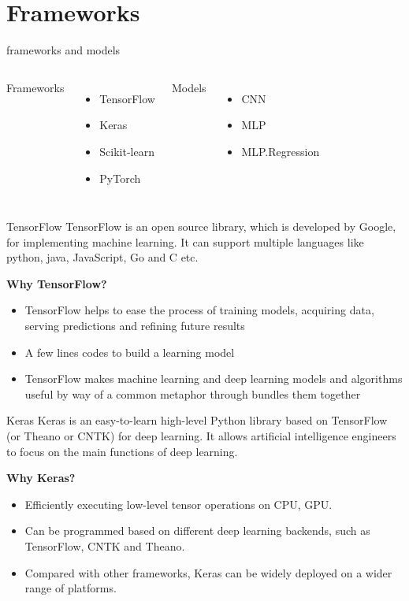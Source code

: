 \documentclass[10pt]{beamer}
\begin{document}
\section[Frameworks]{Frameworks}
\begin{frame}{frameworks and models}
\begin{columns}[T,onlytextwidth]
    Frameworks
    \begin{itemize}
        \item TensorFlow
        \item Keras
        \item Scikit-learn
        \item PyTorch
    \end{itemize}
    Models
    \begin{itemize}
        \item CNN
        \item MLP
        \item MLP.Regression
    \end{itemize}
\end{columns}
\end{frame}

\begin{frame}{TensorFlow}
TensorFlow is an open source library, which is developed by Google, for implementing machine learning. It can support multiple languages like python, java, JavaScript, Go and C etc.\par
\textbf{Why TensorFlow?}
\begin{itemize}
    \item TensorFlow helps to ease the process of training models, acquiring data, serving predictions and refining future results
    \item A few lines codes to build a learning model
    \item TensorFlow makes machine learning and deep learning models and algorithms useful by way of a common metaphor through bundles them  together
\end{itemize}
\end{frame}

\begin{frame}{Keras}
Keras is an easy-to-learn high-level Python library based on TensorFlow (or Theano or CNTK) for deep learning. It allows artificial intelligence engineers to focus on the main functions of deep learning.\par
\textbf{Why Keras?}\par
\begin{itemize}
    \item Efficiently executing low-level tensor operations on CPU, GPU.
    \item Can be programmed based on different deep learning backends, such as TensorFlow, CNTK and Theano.
    \item Compared with other frameworks, Keras can be widely deployed on a wider range of platforms.
\end{itemize}
\end{frame}
\end{document}
